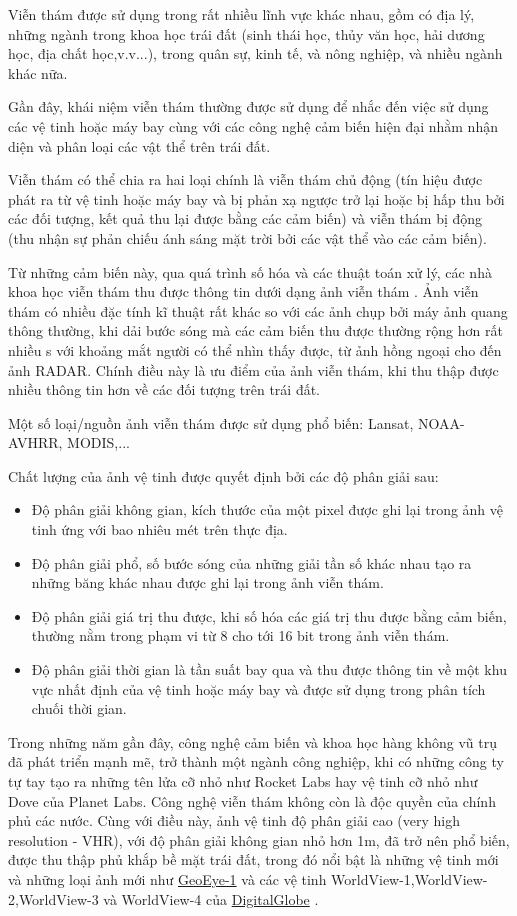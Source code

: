 \documentclass[14pt, oneside, a4paper, openany]{scrartcl}
\begin{document}
Viễn thám được sử dụng trong rất nhiều lĩnh vực khác nhau, gồm có địa lý, những ngành trong khoa học trái đất (sinh thái học, thủy văn học, hải dương học, địa chất học,v.v...), trong quân sự, kinh tế, và nông nghiệp, và nhiều ngành khác nữa.

Gần đây, khái niệm viễn thám thường được sử dụng để nhắc đến việc sử dụng các vệ tinh hoặc máy bay cùng với các công nghệ cảm biến hiện đại nhằm nhận diện và phân loại các vật thể trên trái đất.

Viễn thám có thể chia ra hai loại chính là viễn thám chủ động (tín hiệu được phát ra từ vệ tinh hoặc máy bay và bị phản xạ ngược trở lại hoặc bị hấp thu bởi các đối tượng, kết quả thu lại được bằng các cảm biến) và viễn thám bị động (thu nhận sự phản chiếu ánh sáng mặt trời bởi các vật thể vào các cảm biến).

Từ những cảm biến này, qua quá trình số hóa và các thuật toán xử lý, các nhà khoa học viễn thám thu được thông tin dưới dạng ảnh viễn thám . Ảnh viễn thám có nhiều đặc tính kĩ thuật rất khác so với các ảnh chụp bởi máy ảnh quang thông thường, khi dải bước sóng mà các cảm biến thu được thường rộng hơn rất nhiều s với khoảng mắt người có thể nhìn thấy được, từ ảnh hồng ngoại cho đến ảnh RADAR. Chính điều này là ưu điểm của ảnh viễn thám, khi thu thập được nhiều thông tin hơn về các đối tượng trên trái đất. 

Một số loại/nguồn ảnh viễn thám được sử dụng phổ biến: Lansat, NOAA-AVHRR, MODIS,...

Chất lượng của ảnh vệ tinh được quyết định bởi các độ phân giải sau:
\begin{itemize}
	\item Độ phân giải không gian, kích thước của một pixel được ghi lại trong ảnh vệ tinh ứng với bao nhiêu mét trên thực địa.
	\item Độ phân giải phổ, số bước sóng của những giải tần số khác nhau tạo ra những băng khác nhau được ghi lại trong ảnh viễn thám.
	\item Độ phân giải giá trị thu được, khi số hóa các giá trị thu được bằng cảm biến, thường nằm trong phạm vi từ 8 cho tới 16 bit trong ảnh viễn thám.
	\item Độ phân giải thời gian là tần suất bay qua và thu được thông tin về một khu vực nhất định của vệ tinh hoặc máy bay và được sử dụng trong phân tích chuối thời gian.
\end{itemize}

Trong những năm gần đây, công nghệ cảm biến và khoa học hàng không vũ trụ đã phát triển mạnh mẽ, trở thành một ngành công nghiệp, khi có những công ty tự tay tạo ra những tên lửa cỡ nhỏ như Rocket Labs hay vệ tinh cỡ nhỏ như Dove của Planet Labs. Công nghệ viễn thám không còn là độc quyền của chính phủ các nước. Cùng với điều này, ảnh vệ tinh độ phân giải cao   (very high resolution - VHR), với độ phân giải không gian nhỏ hơn 1m, đã trở nên phổ biến, được thu thập phủ khắp bề mặt trái đất, trong đó nổi bật là những vệ tinh mới và những loại ảnh mới như \href{http://www.satimagingcorp.com/gallery/geoeye-1/}{GeoEye-1} \cite{geoeye} và các vệ tinh WorldView-1,WorldView-2,WorldView-3 và WorldView-4 của \href{https://www.digitalglobe.com/}{DigitalGlobe} \cite{digiglob}.
\end{document}
